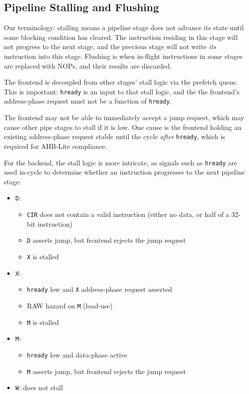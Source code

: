 \documentclass[notitlepage]{article}
\begin{document}
\subsection{Pipeline Stalling and Flushing}
\label{section:stalling_flushing}

Our terminology: stalling means a pipeline stage does not advance its state until some blocking condition has cleared. The instruction residing in this stage will not progress to the next stage, and the previous stage will not write \textit{its} instruction into this stage. Flushing is when in-flight instructions in some stages are replaced with NOPs, and their results are discarded.

The frontend is decoupled from other stages' stall logic via the prefetch queue. This is important: \texttt{hready} is an input to that stall logic, and the the frontend's address-phase request must not be a function of \texttt{hready}.

The frontend may not be able to immediately accept a jump request, which may cause other pipe stages to stall if it is low. One cause is the frontend holding an existing address-phase request stable until the cycle \textit{after} \texttt{hready}, which is required for AHB-Lite compliance.

For the backend, the stall logic is more intricate, as signals such as \texttt{hready} are used in-cycle to determine whether an instruction progresses to the next pipeline stage:

\begin{itemize}
	\item \texttt{D}:
	\begin{itemize}
		\item \texttt{CIR} does not contain a valid instruction (either no data, or half of a 32-bit instruction)
		\item \texttt{D} asserts jump, but frontend rejects the jump request
		\item \texttt{X} is stalled
	\end{itemize}
	\item \texttt{X}:
	\begin{itemize}
		\item \texttt{hready} low and \texttt{X} address-phase request asserted
		\item RAW hazard on \texttt{M} (load-use)
		\item \texttt{M} is stalled
	\end{itemize}
	\item \texttt{M}:
	\begin{itemize}
		\item \texttt{hready} low and data-phase active
		\item \texttt{M} asserts jump, but frontend rejects the jump request
	\end{itemize}
	\item \texttt{W}: does not stall
\end{itemize}
\end{document}
